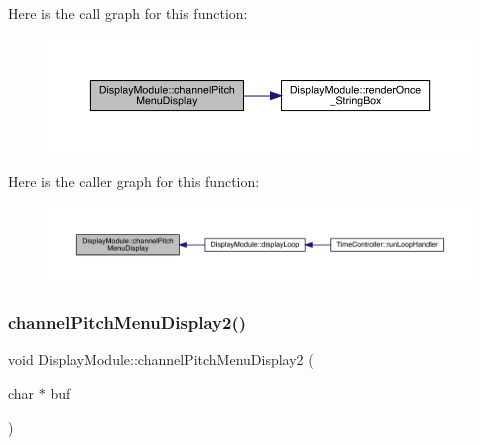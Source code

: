 Here is the call graph for this function\+:
\nopagebreak
\begin{figure}[H]
\begin{center}
\leavevmode
\includegraphics[width=350pt]{class_display_module_a61c9ecea836833a5460f2834a18eef05_cgraph}
\end{center}
\end{figure}
Here is the caller graph for this function\+:
\nopagebreak
\begin{figure}[H]
\begin{center}
\leavevmode
\includegraphics[width=350pt]{class_display_module_a61c9ecea836833a5460f2834a18eef05_icgraph}
\end{center}
\end{figure}
\mbox{\label{class_display_module_a5e665571a41c10190dd2015489f87f3e}} 
\subsubsection{\texorpdfstring{channel\+Pitch\+Menu\+Display2()}{channelPitchMenuDisplay2()}}
{\footnotesize\ttfamily void Display\+Module\+::channel\+Pitch\+Menu\+Display2 (\begin{DoxyParamCaption}\item[{char $\ast$}]{buf }\end{DoxyParamCaption})}

